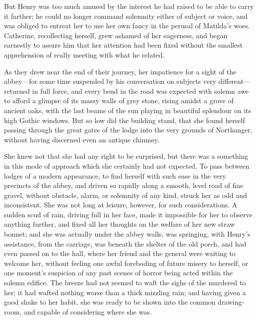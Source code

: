 
But Henry was too much amused by the interest he had raised to be able to carry it farther; he could no longer command solemnity either of subject or voice, and was obliged to entreat her to use her own fancy in the perusal of Matilda's woes. Catherine, recollecting herself, grew ashamed of her eagerness, and began earnestly to assure him that her attention had been fixed without the smallest apprehension of really meeting with what he related. 

As they drew near the end of their journey, her impatience for a sight of the abbey---for some time suspended by his conversation on subjects very different---returned in full force, and every bend in the road was expected with solemn awe to afford a glimpse of its massy walls of grey stone, rising amidst a grove of ancient oaks, with the last beams of the sun playing in beautiful splendour on its high Gothic windows. But so low did the building stand, that she found herself passing through the great gates of the lodge into the very grounds of Northanger, without having discerned even an antique chimney.

She knew not that she had any right to be surprised, but there was a something in this mode of approach which she certainly had not expected. To pass between lodges of a modern appearance, to find herself with such ease in the very precincts of the abbey, and driven so rapidly along a smooth, level road of fine gravel, without obstacle, alarm, or solemnity of any kind, struck her as odd and inconsistent. She was not long at leisure, however, for such considerations. A sudden scud of rain, driving full in her face, made it impossible for her to observe anything further, and fixed all her thoughts on the welfare of her new straw bonnet; and she was actually under the abbey walls, was springing, with Henry's assistance, from the carriage, was beneath the shelter of the old porch, and had even passed on to the hall, where her friend and the general were waiting to welcome her, without feeling one awful foreboding of future misery to herself, or one moment's suspicion of any past scenes of horror being acted within the solemn edifice. The breeze had not seemed to waft the sighs of the murdered to her; it had wafted nothing worse than a thick mizzling rain; and having given a good shake to her habit, she was ready to be shown into the common drawing-room, and capable of considering where she was.

